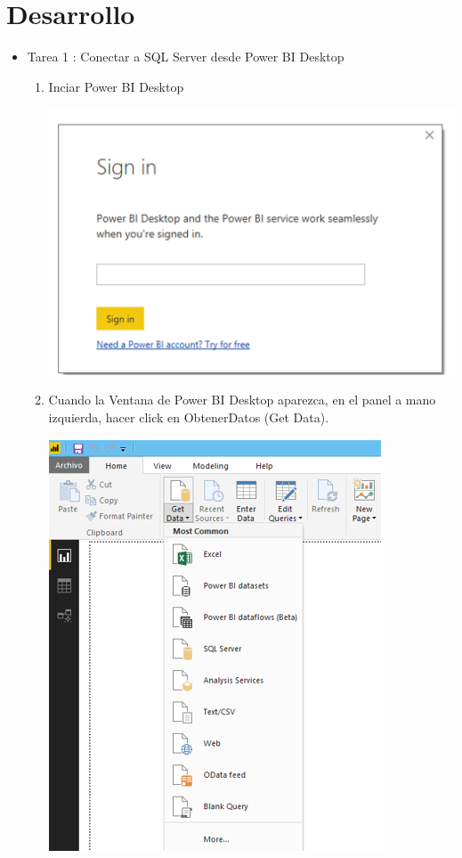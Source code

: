 \section{Desarrollo } 

\begin{itemize}
\item Tarea 1 : Conectar a SQL Server desde Power BI Desktop


\begin{enumerate}
\item Inciar Power BI Desktop

\begin{center}
\includegraphics[scale=0.55]{./Imagenes/a1.png}
\end{center}

\item Cuando la Ventana de Power BI Desktop aparezca, en el panel a mano izquierda, hacer click en ObtenerDatos (Get Data).

\begin{center}
\includegraphics[scale=0.55]{./Imagenes/a2.png}
\end{center}



\end{enumerate}
\end{itemize}
